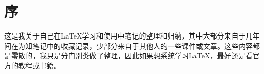 \section{序}

这是我关于自己在\LaTeX 学习和使用中笔记的整理和归纳，其中大部分来自于几年间在为知笔记中的收藏记录，少部分来自于其他人的一些课件或文章。这些内容都是零散的，我只是分门别类做了整理，因此如果想系统学习\LaTeX ，最好还是看官方的教程或书籍。